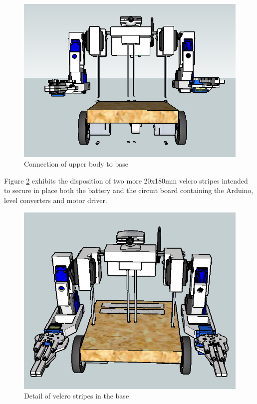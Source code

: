 	\begin{figure}[H]
			\centering
			\includegraphics[scale=0.5]{images/Assembly/26.png}
			\caption{Connection of upper body to base }
			\label{ass26}
	\end{figure}
	\bigskip



 \newpage
 Figure \ref{ass28} exhibits the disposition of two more 20x180mm velcro stripes intended to secure in place both the battery and the circuit board containing the Arduino, level converters and motor driver. \\

	\begin{figure}[H]
			\centering
			\includegraphics[scale=0.5]{images/Assembly/28.png}
			\caption{Detail of velcro stripes in the base}
			\label{ass28}
	\end{figure}
	\bigskip

